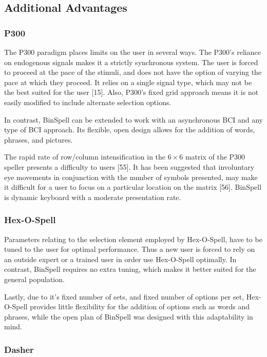 \documentclass[12pt,titlepage]{article}
\begin{document}
\subsection{Additional Advantages}

\subsubsection{P300}

The P300 paradigm places limits on the user in several ways.  The P300's reliance on 
endogenous signals makes it a strictly synchronous system.  The user is forced to proceed at the 
pace of the stimuli, and does not have the option of varying the pace at which they proceed.  It 
relies on a single signal type, which may not be the best suited for the user [15].  Also, P300's 
fixed grid approach means it is not easily modified to include alternate selection options.

In contrast, BinSpell can be extended to work with an asynchronous BCI and any type of BCI 
approach.  Its flexible, open design allows for the addition of words, phrases, and pictures.

The rapid rate of row/column intensification in the $6\times6$ matrix of the P300 speller presents a 
difficulty to users [55].  It has been suggested that involuntary eye movements in conjunction with 
the number of symbols presented, may make it difficult for a user to focus on a particular 
location on the matrix [56].  BinSpell is dynamic keyboard with a moderate presentation rate.

\subsubsection{Hex-O-Spell}

Parameters relating to the selection element employed by Hex-O-Spell, have to be tuned to the 
user for optimal performance.  Thus a new user is forced to rely on an outside expert or a 
trained user in order use Hex-O-Spell optimally.  In contrast, BinSpell requires no extra tuning, 
which makes it better suited for the general population. 

Lastly, due to it's fixed number of sets, and fixed number of options per set, Hex-O-Spell 
provides little flexibility for the addition of options such as words and phrases, while the open 
plan of BinSpell was designed with this adaptability in mind.

\subsubsection{Dasher}
\end{document}
